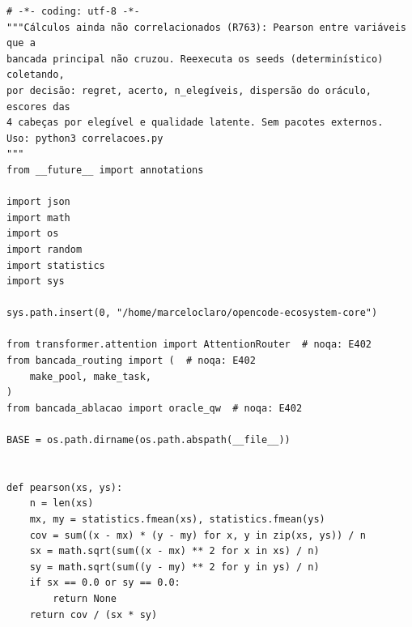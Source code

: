 \documentclass[12pt,openany,oneside,a4paper,brazil,chapter=TITLE]{abntex2}
\begin{document}
\begin{lstlisting}
# -*- coding: utf-8 -*-
"""Cálculos ainda não correlacionados (R763): Pearson entre variáveis que a
bancada principal não cruzou. Reexecuta os seeds (determinístico) coletando,
por decisão: regret, acerto, n_elegíveis, dispersão do oráculo, escores das
4 cabeças por elegível e qualidade latente. Sem pacotes externos.
Uso: python3 correlacoes.py
"""
from __future__ import annotations

import json
import math
import os
import random
import statistics
import sys

sys.path.insert(0, "/home/marceloclaro/opencode-ecosystem-core")

from transformer.attention import AttentionRouter  # noqa: E402
from bancada_routing import (  # noqa: E402
    make_pool, make_task,
)
from bancada_ablacao import oracle_qw  # noqa: E402

BASE = os.path.dirname(os.path.abspath(__file__))


def pearson(xs, ys):
    n = len(xs)
    mx, my = statistics.fmean(xs), statistics.fmean(ys)
    cov = sum((x - mx) * (y - my) for x, y in zip(xs, ys)) / n
    sx = math.sqrt(sum((x - mx) ** 2 for x in xs) / n)
    sy = math.sqrt(sum((y - my) ** 2 for y in ys) / n)
    if sx == 0.0 or sy == 0.0:
        return None
    return cov / (sx * sy)



\end{lstlisting}
\end{document}

